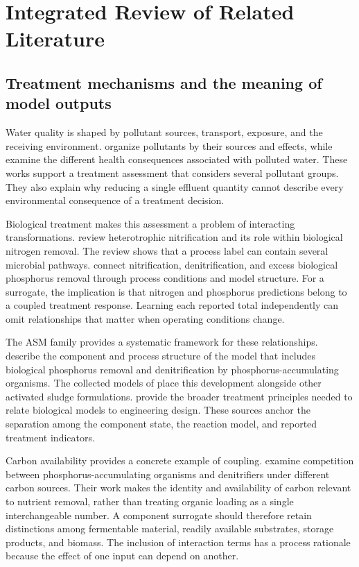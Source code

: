 \chapter{Integrated Review of Related Literature}
\label{ch:literature}

\section{Treatment mechanisms and the meaning of model outputs}

Water quality is shaped by pollutant sources, transport, exposure, and the receiving environment. \citet{Madhav2019} organize pollutants by their sources and effects, while \citet{Lin2022} examine the different health consequences associated with polluted water. These works support a treatment assessment that considers several pollutant groups. They also explain why reducing a single effluent quantity cannot describe every environmental consequence of a treatment decision.

Biological treatment makes this assessment a problem of interacting transformations. \citet{Duan2022} review heterotrophic nitrification and its role within biological nitrogen removal. The review shows that a process label can contain several microbial pathways. \citet{Wentzel1992} connect nitrification, denitrification, and excess biological phosphorus removal through process conditions and model structure. For a surrogate, the implication is that nitrogen and phosphorus predictions belong to a coupled treatment response. Learning each reported total independently can omit relationships that matter when operating conditions change.

The ASM family provides a systematic framework for these relationships. \citet{Henze1999} describe the component and process structure of the model that includes biological phosphorus removal and denitrification by phosphorus-accumulating organisms. The collected models of \citet{Henze2006} place this development alongside other activated sludge formulations. \citet{Henze2008} provide the broader treatment principles needed to relate biological models to engineering design. These sources anchor the separation among the component state, the reaction model, and reported treatment indicators.

Carbon availability provides a concrete example of coupling. \citet{Guerrero2011} examine competition between phosphorus-accumulating organisms and denitrifiers under different carbon sources. Their work makes the identity and availability of carbon relevant to nutrient removal, rather than treating organic loading as a single interchangeable number. A component surrogate should therefore retain distinctions among fermentable material, readily available substrates, storage products, and biomass. The inclusion of interaction terms has a process rationale because the effect of one input can depend on another.

